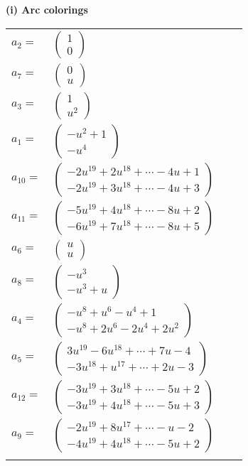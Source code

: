 \documentclass[1p]{elsarticle_modified}
\theoremstyle{definition}
\begin{document}
\flushleft \textbf{(i) Arc colorings}\\
\begin{tabular}{m{7pt} m{180pt} m{7pt} m{180pt} }
\flushright $a_{2}=$&$\begin{pmatrix}1\\0\end{pmatrix}$ \\
\flushright $a_{7}=$&$\begin{pmatrix}0\\u\end{pmatrix}$ \\
\flushright $a_{3}=$&$\begin{pmatrix}1\\u^2\end{pmatrix}$ \\
\flushright $a_{1}=$&$\begin{pmatrix}- u^2+1\\- u^4\end{pmatrix}$ \\
\flushright $a_{10}=$&$\begin{pmatrix}-2 u^{19}+2 u^{18}+\cdots-4 u+1\\-2 u^{19}+3 u^{18}+\cdots-4 u+3\end{pmatrix}$ \\
\flushright $a_{11}=$&$\begin{pmatrix}-5 u^{19}+4 u^{18}+\cdots-8 u+2\\-6 u^{19}+7 u^{18}+\cdots-8 u+5\end{pmatrix}$ \\
\flushright $a_{6}=$&$\begin{pmatrix}u\\u\end{pmatrix}$ \\
\flushright $a_{8}=$&$\begin{pmatrix}- u^3\\- u^3+u\end{pmatrix}$ \\
\flushright $a_{4}=$&$\begin{pmatrix}- u^8+u^6- u^4+1\\- u^8+2 u^6-2 u^4+2 u^2\end{pmatrix}$ \\
\flushright $a_{5}=$&$\begin{pmatrix}3 u^{19}-6 u^{18}+\cdots+7 u-4\\-3 u^{18}+u^{17}+\cdots+2 u-3\end{pmatrix}$ \\
\flushright $a_{12}=$&$\begin{pmatrix}-3 u^{19}+3 u^{18}+\cdots-5 u+2\\-3 u^{19}+4 u^{18}+\cdots-5 u+3\end{pmatrix}$ \\
\flushright $a_{9}=$&$\begin{pmatrix}-2 u^{19}+8 u^{17}+\cdots- u-2\\-4 u^{19}+4 u^{18}+\cdots-5 u+2\end{pmatrix}$\\&\end{tabular}
\end{document}
